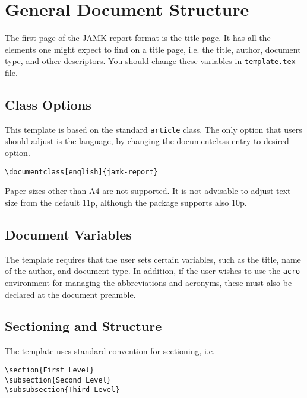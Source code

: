\documentclass[english]{jamk-report}
\begin{document}
\section{General Document Structure}

The first page of the JAMK report format is the title page. It has all the
elements one might expect to find on a title page, i.e. the title, author,
document type, and other descriptors. You should change these variables
in \texttt{template.tex} file.

\subsection{Class Options}

This template is based on the standard \texttt{article} class. The only option
that users should adjust is the language, by changing the documentclass entry
to desired option.

\begin{verbatim}
\documentclass[english]{jamk-report}
\end{verbatim}

Paper sizes other than A4 are not supported. It is not advisable to adjust text
size from the default 11p, although the package supports also 10p.

\subsection{Document Variables}

The template requires that the user sets certain variables, such as the title,
name of the author, and document type. In addition, if the user wishes to use
the \texttt{acro} environment for managing the abbreviations and acronyms, these
must also be declared at the document preamble.


\subsection{Sectioning and Structure}

The template uses standard convention for sectioning, i.e. 

\begin{verbatim}
\section{First Level}
\subsection{Second Level}
\subsubsection{Third Level}
\end{verbatim}
\end{document}
